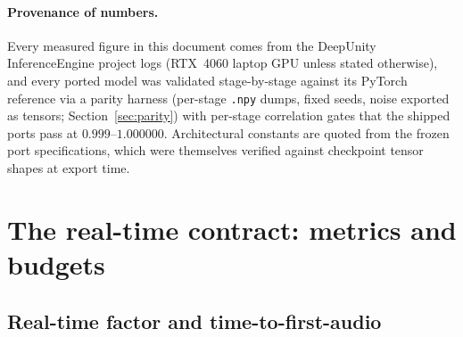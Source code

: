 \documentclass[11pt,a4paper]{article}
\newcommand{\code}[1]{\texttt{#1}}
\begin{document}
\paragraph{Provenance of numbers.} Every measured figure in this document comes from the
DeepUnity InferenceEngine project logs (RTX~4060 laptop GPU unless stated otherwise), and
every ported model was validated stage-by-stage against its PyTorch reference via a
parity harness (per-stage \code{.npy} dumps, fixed seeds, noise exported as tensors;
Section~\ref{sec:parity}) with per-stage correlation gates that the shipped ports pass at
$0.999$--$1.000000$. Architectural constants are quoted from the frozen port
specifications, which were themselves verified against checkpoint tensor shapes at
export time.

\section{The real-time contract: metrics and budgets}
\label{sec:metrics}

\subsection{Real-time factor and time-to-first-audio}
\label{sec:rtf}
\end{document}
